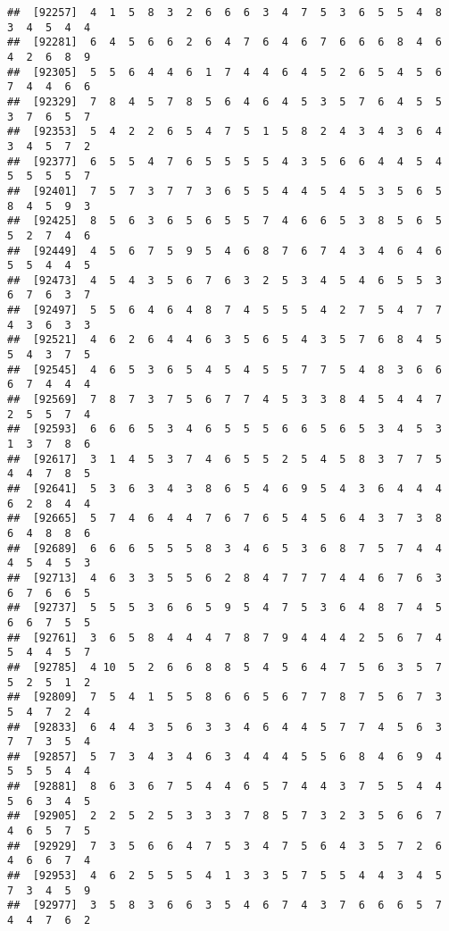 \documentclass[
]{book}
\begin{document}
\begin{verbatim}
##  [92257]  4  1  5  8  3  2  6  6  6  3  4  7  5  3  6  5  5  4  8  3  4  5  4  4
##  [92281]  6  4  5  6  6  2  6  4  7  6  4  6  7  6  6  6  8  4  6  4  2  6  8  9
##  [92305]  5  5  6  4  4  6  1  7  4  4  6  4  5  2  6  5  4  5  6  7  4  4  6  6
##  [92329]  7  8  4  5  7  8  5  6  4  6  4  5  3  5  7  6  4  5  5  3  7  6  5  7
##  [92353]  5  4  2  2  6  5  4  7  5  1  5  8  2  4  3  4  3  6  4  3  4  5  7  2
##  [92377]  6  5  5  4  7  6  5  5  5  5  4  3  5  6  6  4  4  5  4  5  5  5  5  7
##  [92401]  7  5  7  3  7  7  3  6  5  5  4  4  5  4  5  3  5  6  5  8  4  5  9  3
##  [92425]  8  5  6  3  6  5  6  5  5  7  4  6  6  5  3  8  5  6  5  5  2  7  4  6
##  [92449]  4  5  6  7  5  9  5  4  6  8  7  6  7  4  3  4  6  4  6  5  5  4  4  5
##  [92473]  4  5  4  3  5  6  7  6  3  2  5  3  4  5  4  6  5  5  3  6  7  6  3  7
##  [92497]  5  5  6  4  6  4  8  7  4  5  5  5  4  2  7  5  4  7  7  4  3  6  3  3
##  [92521]  4  6  2  6  4  4  6  3  5  6  5  4  3  5  7  6  8  4  5  5  4  3  7  5
##  [92545]  4  6  5  3  6  5  4  5  4  5  5  7  7  5  4  8  3  6  6  6  7  4  4  4
##  [92569]  7  8  7  3  7  5  6  7  7  4  5  3  3  8  4  5  4  4  7  2  5  5  7  4
##  [92593]  6  6  6  5  3  4  6  5  5  5  6  6  5  6  5  3  4  5  3  1  3  7  8  6
##  [92617]  3  1  4  5  3  7  4  6  5  5  2  5  4  5  8  3  7  7  5  4  4  7  8  5
##  [92641]  5  3  6  3  4  3  8  6  5  4  6  9  5  4  3  6  4  4  4  6  2  8  4  4
##  [92665]  5  7  4  6  4  4  7  6  7  6  5  4  5  6  4  3  7  3  8  6  4  8  8  6
##  [92689]  6  6  6  5  5  5  8  3  4  6  5  3  6  8  7  5  7  4  4  4  5  4  5  3
##  [92713]  4  6  3  3  5  5  6  2  8  4  7  7  7  4  4  6  7  6  3  6  7  6  6  5
##  [92737]  5  5  5  3  6  6  5  9  5  4  7  5  3  6  4  8  7  4  5  6  6  7  5  5
##  [92761]  3  6  5  8  4  4  4  7  8  7  9  4  4  4  2  5  6  7  4  5  4  4  5  7
##  [92785]  4 10  5  2  6  6  8  8  5  4  5  6  4  7  5  6  3  5  7  5  2  5  1  2
##  [92809]  7  5  4  1  5  5  8  6  6  5  6  7  7  8  7  5  6  7  3  5  4  7  2  4
##  [92833]  6  4  4  3  5  6  3  3  4  6  4  4  5  7  7  4  5  6  3  7  7  3  5  4
##  [92857]  5  7  3  4  3  4  6  3  4  4  4  5  5  6  8  4  6  9  4  5  5  5  4  4
##  [92881]  8  6  3  6  7  5  4  4  6  5  7  4  4  3  7  5  5  4  4  5  6  3  4  5
##  [92905]  2  2  5  2  5  3  3  3  7  8  5  7  3  2  3  5  6  6  7  4  6  5  7  5
##  [92929]  7  3  5  6  6  4  7  5  3  4  7  5  6  4  3  5  7  2  6  4  6  6  7  4
##  [92953]  4  6  2  5  5  5  4  1  3  3  5  7  5  5  4  4  3  4  5  7  3  4  5  9
##  [92977]  3  5  8  3  6  6  3  5  4  6  7  4  3  7  6  6  6  5  7  4  4  7  6  2

\end{verbatim}
\end{document}
